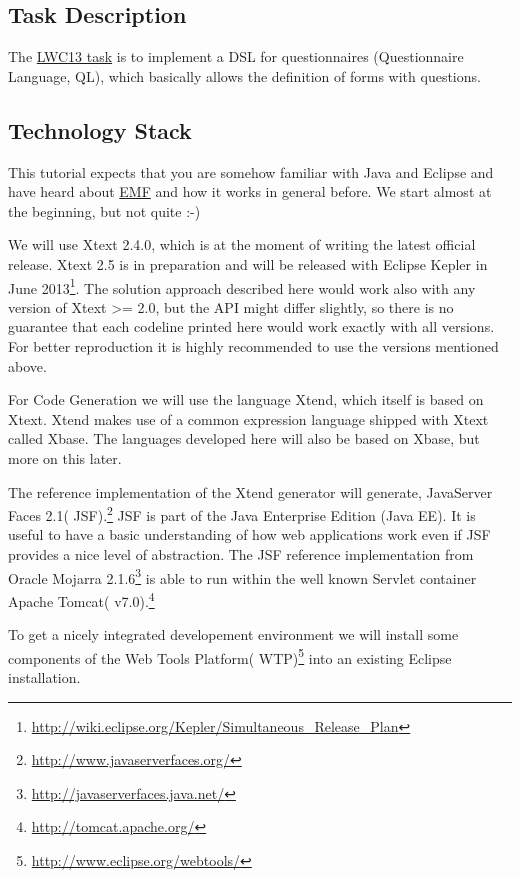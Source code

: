 \subsection{Task Description}
The {\href{http://www.languageworkbenches.net/images/5/53/Ql.pdf}{LWC13 task}}
is to implement a DSL for questionnaires (Questionnaire Language, QL), which
basically allows the definition of forms with questions.


\subsection{Technology Stack}
\label{subsec:technologyStack}
This tutorial expects that you are somehow familiar with Java and Eclipse and
have heard about \url{EMF} and how it works in general before. We start almost at the
beginning, but not quite :-) 

We will use Xtext 2.4.0, which is at the moment of writing the latest official
release.
Xtext 2.5 is in preparation and will be released with Eclipse Kepler in June
2013\footnote{\url{http://wiki.eclipse.org/Kepler/Simultaneous_Release_Plan}}.
The solution approach described here would work also with any version
of Xtext >= 2.0, but the API might differ slightly, so there is no guarantee
that each codeline printed here would work exactly with all versions. For better
reproduction it is highly recommended to use the versions mentioned above.

For Code Generation we will use the language Xtend, which itself is based on
Xtext. Xtend makes use of a common expression language shipped with Xtext called
Xbase. The languages developed here will also be based on Xbase, but more on
this later.

The reference implementation of the Xtend generator will generate, 
JavaServer Faces 2.1( JSF).\footnote{\url{http://www.javaserverfaces.org/}} 
JSF is part of the Java Enterprise Edition (Java EE). It is useful to have a 
basic understanding of how web applications work even if JSF provides a nice level 
of abstraction. The JSF reference implementation from 
Oracle Mojarra 2.1.6\footnote{\url{http://javaserverfaces.java.net/}} is able to run 
within the well known Servlet container Apache Tomcat( v7.0).\footnote{\url{http://tomcat.apache.org/}} 

To get a nicely integrated developement environment we will install some components of the
Web Tools Platform( WTP)\footnote{\url{http://www.eclipse.org/webtools/}} into an existing Eclipse installation.